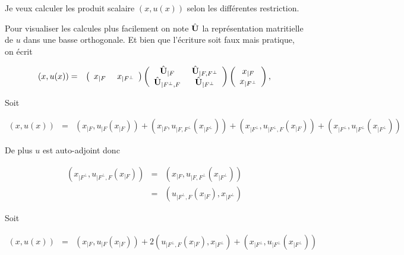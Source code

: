 Je veux calculer les produit scalaire $\left ( x , u (x) \right )$ selon les différentes restriction. 

Pour visualiser les calcules plus facilement on note $\hat{\mathbf{U}}$ la représentation matritielle de $u$ dans une basse orthogonale. Et bien que l'écriture soit faux mais pratique, on écrit 

\begin{eqnarray*}
	\left ( x , u (x) \right ) & = &  \left ( \begin{array}{cc} x_{\vert F } &  x_{\vert F^\perp }  \end{array} \right) \left ( \begin{array}{cc} \operator{U}_{\vert F} & \operator{U}_{\vert F , F^\perp}  \\ \operator{U}_{\vert F^\perp , F } & \operator{U}_{\vert F^\perp} \end{array} \right ) \left (  \begin{array}{c} x_{\vert F} \\  x_{\vert F^\perp} \end{array} \right ) ,
\end{eqnarray*}

Soit 

\begin{eqnarray*}
	\left ( x , u (x) \right ) & = & \left ( x_{\vert F } , u_{\vert F } \left (x_{\vert F } \right ) \right ) + \left ( x_{\vert F } , u_{\vert F , F^\perp  } \left (x_{\vert F^\perp } \right ) \right )  + \left ( x_{\vert F^\perp } , u_{\vert F^\perp , F  } \left (x_{\vert F } \right ) \right )  + \left ( x_{\vert F^\perp } , u_{\vert F^\perp } \left (x_{\vert F^\perp } \right ) \right ) 		
\end{eqnarray*}

De plus $u$ est auto-adjoint donc 

\begin{eqnarray*}
	\left ( x_{\vert F^\perp } , u_{\vert F^\perp , F  } \left (x_{\vert F } \right ) \right ) & = & \left ( x_{\vert F } , u_{\vert F , F^\perp  } \left (x_{\vert F^\perp } \right ) \right ) \\
	& = & \left ( u_{\vert F^\perp , F   }\left (x_{\vert F } \right )  ,  x_{\vert F^\perp }  \right )
\end{eqnarray*}

Soit 

\begin{eqnarray*}
	\left ( x , u (x) \right ) & = & \left ( x_{\vert F } , u_{\vert F } \left (x_{\vert F } \right ) \right ) +  2 \left ( u_{\vert F^\perp , F   }\left (x_{\vert F } \right )  ,  x_{\vert F^\perp }  \right )   + \left ( x_{\vert F^\perp } , u_{\vert F^\perp } \left (x_{\vert F^\perp } \right ) \right )		
\end{eqnarray*}

